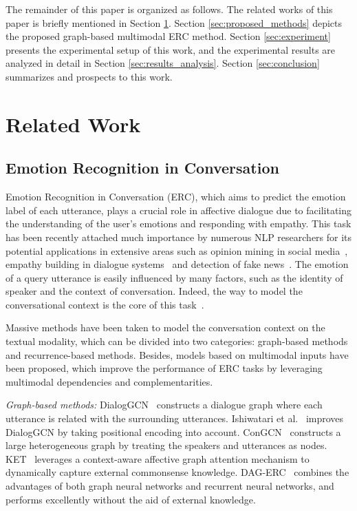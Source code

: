 \documentclass[lettersize,journal]{IEEEtran}
\begin{document}
The remainder of this paper is organized as follows. The related works of this paper is briefly mentioned in Section \ref{sec:related_work}. Section \ref{sec:proposed_methods} depicts the proposed graph-based multimodal ERC method. Section \ref{sec:experiment} presents the experimental setup of this work, and the experimental results are analyzed in detail in Section \ref{sec:results_analysis}. Section \ref{sec:conclusion} summarizes and prospects to this work.

\section{Related Work}\label{sec:related_work}
\subsection{Emotion Recognition in Conversation}
Emotion Recognition in Conversation (ERC), which aims to predict the emotion label of each utterance, plays a crucial role in affective dialogue due to facilitating the understanding of the user's emotions and responding with empathy. This task has been recently attached much importance by numerous NLP researchers for its potential applications in extensive areas such as opinion mining in social media~\cite{chatterjee2019semeval}, empathy building in dialogue systems~\cite{majumder2020mime} and detection of fake news~\cite{zhang2021mining}. The emotion of a query utterance is easily influenced by many factors, such as the identity of speaker and the context of conversation. Indeed, the way to model the conversational context is the core of this task~\cite{poria2018meld}.

Massive methods have been taken to model the conversation context on the textual modality, which can be divided into two categories: graph-based methods and recurrence-based methods. Besides, models based on multimodal inputs have been proposed, which improve the performance of ERC tasks by leveraging multimodal dependencies and complementarities.

\textit{Graph-based methods:} DialogGCN~\cite{ghosal2019dialoguegcn} constructs a dialogue graph where each utterance is related with the surrounding utterances. Ishiwatari et al.~\cite{ishiwatari2020relation} improves DialogGCN by taking positional encoding into account. ConGCN~\cite{zhang2019modeling} constructs a large heterogeneous graph by treating the speakers and utterances as nodes. KET~\cite{zhong2019knowledge} leverages a context-aware affective graph attention mechanism to dynamically capture external commonsense knowledge. DAG-ERC~\cite{DBLP:conf/acl/ShenWYQ20} combines the advantages of both graph neural networks and recurrent neural networks, and performs excellently without the aid of external knowledge.
\end{document}
